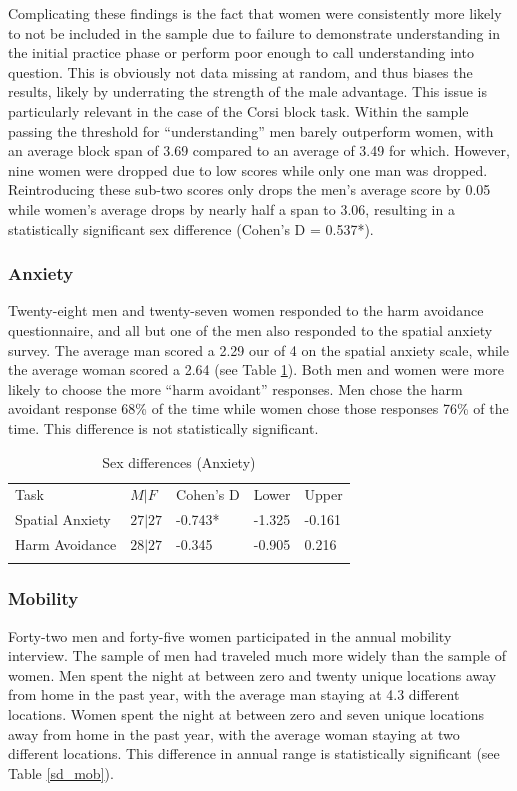 Complicating these findings is the fact that women were consistently more likely to not be included in the sample due to failure to demonstrate understanding in the initial practice phase or perform poor enough to call understanding into question.  This is obviously not data missing at random, and thus biases the results, likely by underrating the strength of the male advantage.  This issue is particularly relevant in the case of the Corsi block task.  Within the sample passing the threshold for ``understanding'' men barely outperform women, with an average block span of 3.69 compared to an average of 3.49 for which.  However, nine women were dropped due to low scores while only one man was dropped.  Reintroducing these sub-two scores only drops the men's average score by 0.05 while women's average drops by nearly half a span to 3.06, resulting in a statistically significant sex difference (Cohen's D = 0.537*). 

		\subsubsection{Anxiety}
		\label{sec:3.1.2}
Twenty-eight men and twenty-seven women responded to the harm avoidance questionnaire, and all but one of the men also responded to the spatial anxiety survey.  The average man scored a 2.29 our of 4 on the spatial anxiety scale, while the average woman scored a 2.64 (see Table \ref{tab:sd_anx}).  Both men and women were more likely to choose the more ``harm avoidant'' responses.  Men chose the harm avoidant response 68\% of the time while women chose those responses 76\% of the time.  This difference is not statistically significant.

\begin{table}[h!]
\caption{Sex differences (Anxiety)}
\label{tab:sd_anx}  
\begin{tabular}{lllll}
\hline\noalign{\smallskip}
Task & $M|F$ & Cohen's D & Lower & Upper  \\
\noalign{\smallskip}\hline\noalign{\smallskip}
Spatial Anxiety & $27|27$ & -0.743* & -1.325 & -0.161 \\
Harm Avoidance & $28|27$ & -0.345 & -0.905 & \phantom{-}0.216 \\
\noalign{\smallskip}\hline
\end{tabular}
\end{table}

		\subsubsection{Mobility}
		\label{sec:3.1.2}
Forty-two men and forty-five women participated in the annual mobility interview.  The sample of men had traveled much more widely than the sample of women.  Men spent the night at between zero and twenty unique locations away from home in the past year, with the average man staying at 4.3 different locations.  Women spent the night at between zero and seven unique locations away from home in the past year, with the average woman staying at two different locations.  This difference in annual range is statistically significant (see Table \ref{sd_mob}).  

